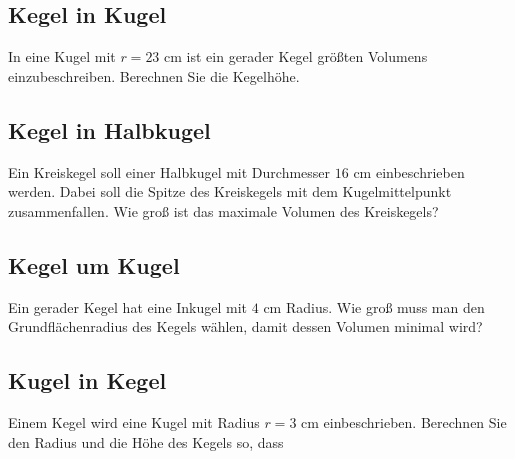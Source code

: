
\subsection{Kegel in Kugel}
In eine Kugel mit $r = 23 \text{ cm}$ ist ein gerader Kegel größten Volumens einzubeschreiben. Berechnen Sie die Kegelhöhe.


\subsection{Kegel in Halbkugel}
Ein Kreiskegel soll einer Halbkugel mit Durchmesser $16 \text{ cm}$
einbeschrieben werden. Dabei soll die Spitze des Kreiskegels mit dem
Kugelmittelpunkt zusammenfallen. Wie groß ist das maximale Volumen des
Kreiskegels?




\subsection{Kegel um Kugel}

Ein gerader Kegel hat eine Inkugel mit $4 \text{ cm}$
Radius. Wie groß muss man den Grundflächenradius des Kegels wählen, damit dessen Volumen minimal wird?




\subsection{Kugel in Kegel}
Einem Kegel wird eine Kugel mit Radius $r = 3 \text{ cm}$
einbeschrieben. Berechnen Sie den Radius und die Höhe des Kegels so,
dass

